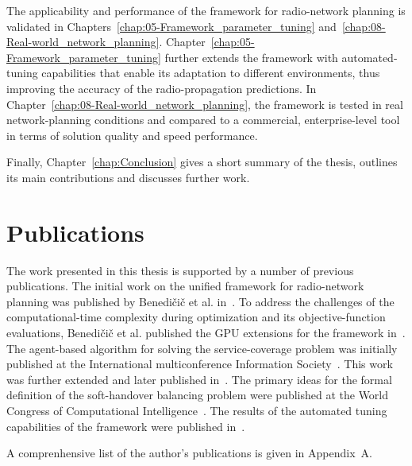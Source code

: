 The applicability and performance of the framework for radio-network
planning is validated in Chapters~\ref{chap:05-Framework_parameter_tuning}
and~\ref{chap:08-Real-world_network_planning}. Chapter~\ref{chap:05-Framework_parameter_tuning}
further extends the framework with automated-tuning capabilities that
enable its adaptation to different environments, thus improving the
accuracy of the radio-propagation predictions. In Chapter~\ref{chap:08-Real-world_network_planning},
the framework is tested in real network-planning conditions and compared
to a commercial, enterprise-level tool in terms of solution quality
and speed performance.

Finally, Chapter~\ref{chap:Conclusion} gives a short summary of
the thesis, outlines its main contributions and discusses further
work.


\section{Publications }

The work presented in this thesis is supported by a number of previous
publications. The initial work on the unified framework for radio-network
planning was published by Benedi\v{c}i\v{c} et al. in~\cite{Benedicic-A_GRASS_GIS_parallel_module_for_radio-propagation_predictions:2013}.
To address the challenges of the computational-time complexity during
optimization and its objective-function evaluations, Benedi\v{c}i\v{c}
et al. published the GPU extensions for the framework in~\cite{Benedicic-A_GPU_based_parallel_agent_optimization_approach:2013}.
The agent-based algorithm for solving the service-coverage problem
was initially published at the International multiconference Information
Society~\cite{Benedicic_Pilot.power.optimization:2010}. This work
was further extended and later published in~\cite{Benedicic-A_GPU_based_parallel_agent_optimization_approach:2013}.
The primary ideas for the formal definition of the soft-handover balancing
problem were published at the World Congress of Computational Intelligence~\cite{Benedicic_Balancing_downlink_uplink_soft_handover_areas_in_UMTS_networks:2012}.
The results of the automated tuning capabilities of the framework
were published in~\cite{Benedicic-An_adaptable_parallel_simulation_framework_for_LTE_coverage_planning:2013}.

A comprenhensive list of the author's publications is given in Appendix~A.
